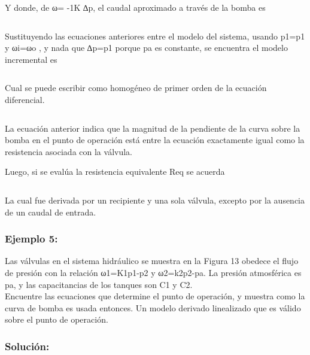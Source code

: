 \documentclass[a4paper,12pt,twoside]{proyectotanquesecci}
\begin{document}
\begin{equation}
\end{equation}

Y donde, de ω= -1K ∆p, el caudal aproximado a través de la bomba es

\begin{equation}
\end{equation}

Sustituyendo las ecuaciones anteriores entre el modelo del sistema, usando p1=p1 y ωi=ωo , y nada que ∆p=p1 porque pa es constante, se encuentra el modelo incremental es 

\begin{equation}
\end{equation}

Cual se puede escribir como homogéneo de primer orden de la ecuación diferencial.

\begin{equation}
\end{equation}

La ecuación anterior indica que la magnitud de la pendiente de la curva sobre la bomba en el punto de operación  está entre la ecuación exactamente igual como la resistencia asociada con la válvula. 

Luego, si se evalúa la resistencia equivalente Req se acuerda

\begin{equation}
\end{equation}

La cual fue derivada por un recipiente y una sola válvula, excepto por la ausencia de un caudal de entrada.

\subsubsection{Ejemplo 5:}

Las válvulas en el sistema hidráulico se muestra en la Figura 13 obedece el flujo de presión con la relación ω1=K1p1-p2 y ω2=k2p2-pa. La presión atmosférica es pa, y las capacitancias de los tanques son C1 y C2. \\
Encuentre las ecuaciones que determine el punto de operación, y muestra como la curva de bomba es usada entonces. Un modelo derivado linealizado que es válido sobre el punto de operación. \\

\subsubsection{Solución:}
\end{document}
